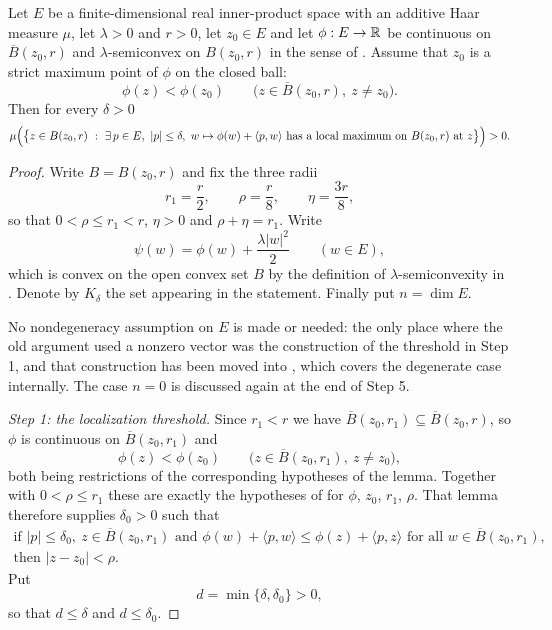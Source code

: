 \begin{lemma}
Let $E$ be a finite-dimensional real inner-product space with an additive Haar
measure $\mu$, let $\lambda>0$ and $r>0$, let $z_0\in E$ and let
$\phi:E\to\mathbb{R}$ be continuous on $\overline B(z_0,r)$ and $\lambda$-semiconvex on
$B(z_0,r)$ in the sense of . Assume that $z_0$ is a strict
maximum point of $\phi$ on the closed ball:
\[
  \phi(z)<\phi(z_0)\qquad\bigl(z\in\overline B(z_0,r),\ z\ne z_0\bigr).
\]
Then for every $\delta>0$
\[
  \mu\Bigl(\bigl\{z\in B(z_0,r)\ :\ \exists\,p\in E,\ |p|\le\delta,\
    w\mapsto\phi(w)+\langle p,w\rangle\ \text{has a local maximum on }
    B(z_0,r)\text{ at }z\bigr\}\Bigr)>0 .
\]
\end{lemma}
\begin{proof}
Write $B=B(z_0,r)$ and fix the three radii
\[
  r_1=\frac r2,\qquad \rho=\frac r8,\qquad \eta=\frac{3r}{8},
\]
so that $0<\rho\le r_1<r$, $\eta>0$ and $\rho+\eta=r_1$. Write
\[
  \psi(w)=\phi(w)+\frac{\lambda|w|^2}{2}\qquad(w\in E),
\]
which is convex on the open convex set $B$ by the definition of
$\lambda$-semiconvexity in . Denote by $K_\delta$ the set
appearing in the statement. Finally put $n=\dim E$.

No nondegeneracy assumption on $E$ is made or needed: the only place where the
old argument used a nonzero vector was the construction of the threshold in
Step 1, and that construction has been moved into
, which covers the degenerate case
internally. The case $n=0$ is discussed again at the end of Step 5.

\emph{Step 1: the localization threshold.}
Since $r_1<r$ we have $\overline B(z_0,r_1)\subseteq\overline B(z_0,r)$, so
$\phi$ is continuous on $\overline B(z_0,r_1)$ and
\[
  \phi(z)<\phi(z_0)\qquad\bigl(z\in\overline B(z_0,r_1),\ z\ne z_0\bigr),
\]
both being restrictions of the corresponding hypotheses of the lemma. Together
with $0<\rho\le r_1$ these are exactly the hypotheses of
 for $\phi$, $z_0$, $r_1$, $\rho$. That
lemma therefore supplies $\delta_0>0$ such that
\begin{equation}\label{eq:jl-loc}
  \begin{gathered}
  \text{if }|p|\le\delta_0,\ z\in\overline B(z_0,r_1)\text{ and }
  \phi(w)+\langle p,w\rangle\le\phi(z)+\langle p,z\rangle
  \text{ for all }w\in\overline B(z_0,r_1),\\
  \text{then }|z-z_0|<\rho .
  \end{gathered}
\end{equation}
Put
\[
  d=\min\{\delta,\delta_0\}>0 ,
\]
so that $d\le\delta$ and $d\le\delta_0$.


\end{proof}
